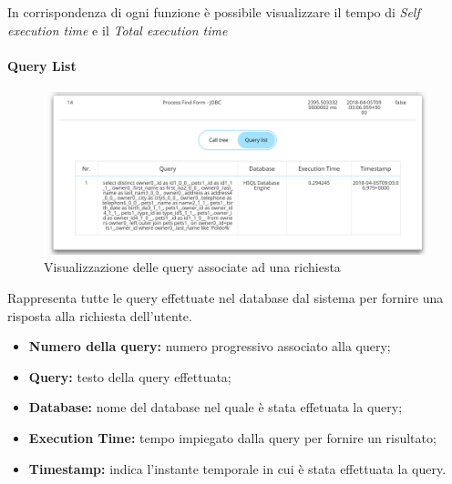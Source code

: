 In corrispondenza di ogni funzione è possibile visualizzare il tempo di \emph{Self execution time} e il \emph{Total execution time}
\\

\paragraph {Query List} \Spazio
\begin{figure}[H]
	\centering 
	\includegraphics[width=1\textwidth]{Images/querylist}
	\caption{Visualizzazione delle query associate ad una richiesta}
\end{figure}
Rappresenta tutte le query effettuate nel database dal sistema per fornire una risposta alla richiesta dell'utente.
    \begin{itemize}
	
	\item \textbf{Numero della query:} numero progressivo associato alla query;
	\item \textbf{Query:} testo della query effettuata;
	\item \textbf{Database:} nome del database nel quale è stata effetuata la query;
	\item \textbf{Execution Time:} tempo impiegato dalla query per fornire un risultato;
	\item \textbf{Timestamp:} indica l'instante temporale in cui è stata effettuata la query.
	
\end{itemize}







